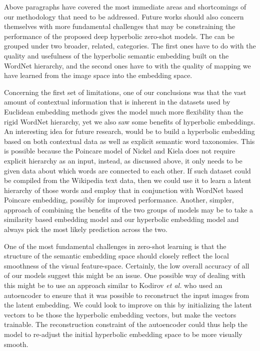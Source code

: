 \documentclass[12pt]{report}
\begin{document}
Above paragraphs have covered the most immediate areas and shortcomings of our methodology that need to be addressed. Future works should also concern themselves with more fundamental challenges that may be constraining the performance of the proposed deep hyperbolic zero-shot models. The can be grouped under two broader, related, categories. The first ones have to do with the quality and usefulness of the hyperbolic semantic embedding built on the WordNet hierarchy, and the second ones have to with the quality of mapping we have learned from the image space into the embedding space.

Concerning the first set of limitations, one of our conclusions was that the vast amount of contextual information that is inherent in the datasets used by Euclidean embedding methods gives the model much more flexibility than the rigid WordNet hierarchy, yet we also saw some benefits of hyperbolic embeddings. An interesting idea for future research, would be to build a hyperbolic embedding based on both contextual data as well as explicit semantic word taxonomies. This is possible because the Poincare model of Nickel and Kiela \cite{Nickel2018} does not require explicit hierarchy as an input, instead, as discussed above, it only needs to be given data about which words are connected to each other. If such dataset could be compiled from the Wikipedia text data, then we could use it to learn a latent hierarchy of those words and employ that in conjunction with WordNet based Poincare embedding, possibly for improved performance. Another, simpler, approach of combining the benefits of the two groups of models may be to take a similarity based embedding model and our hyperbolic embedding model and always pick the most likely prediction across the two. 

One of the most fundamental challenges in zero-shot learning \cite{Ji2017} is that the structure of the semantic embedding space should closely reflect the local smoothness of the visual feature-space. Certainly, the low overall accuracy of all of our models suggest this might be an issue. One possible way of dealing with this might be to use an approach similar to Kodirov \textit{et al.} \cite{Kodirov2017} who used an autoencoder to ensure that it was possible to reconstruct the input images from the latent embedding. We could look to improve on this by initializing the latent vectors to be those the hyperbolic embedding vectors, but make the vectors trainable. The reconstruction constraint of the autoencoder could thus help the model to re-adjust the initial hyperbolic embedding space to be more visually smooth.
\end{document}
